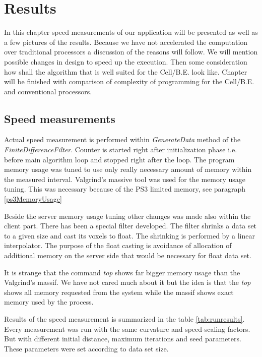 \chapter{Results}

In this chapter speed measurements of our application will be presented as well as a few pictures of the results.
Because we have not accelerated the computation over traditional processors a discussion of the reasons will follow.
We will mention possible changes in design to speed up the execution.
Then some consideration how shall the algorithm that is well suited for the \mbox{Cell/B.E.} look like.
Chapter will be finished with comparison of complexity of programming for the \mbox{Cell/B.E.} and conventional processors.

\section{Speed measurements}

\par
Actual speed measurement is performed within \mbox{\emph{GenerateData}} method of the \mbox{\emph{FiniteDifferenceFilter}}.
Counter is started right after initialization phase i.e. before main algorithm loop and stopped right after the loop.
The program memory usage was tuned to use only really necessary amount of memory within the measured interval.
Valgrind's massive tool was used for the memory usage tuning.
This was necessary because of the PS3 limited memory, see paragraph \ref{ps3MemoryUsage}

\par
Beside the server memory usage tuning other changes was made also within the client part.
There has been a special filter developed.
The filter shrinks a data set to a given size and cast its voxels to float.
The shrinking is performed by a linear interpolator.
The purpose of the float casting is avoidance of allocation of additional memory on the server side that would be necessary for float data set.

\par
It is strange that the command \emph{top} shows far bigger memory usage than the Valgrind's massif.
We have not cared much about it but the idea is that the \emph{top} shows all memory requested from the system while the massif shows exact memory used by the process.

\par
Results of the speed measurement is summarized in the table \ref{tab:runresults}.
Every measurement was run with the same curvature and speed-scaling factors.
But with different initial distance, maximum iterations and seed parameters.
These parameters were set according to data set size.

